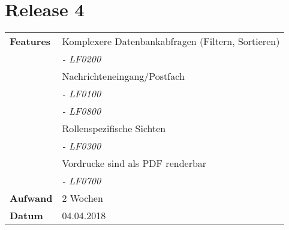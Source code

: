 \section*{Release 4}
\label{sec:release_4}

\begin{tabular}{p{5cm} p{9cm}}
    \textbf{Features} & Komplexere Datenbankabfragen (Filtern, Sortieren) \\
    & \hspace{8pt} \textit{\footnotesize - LF0200} \\
    & Nachrichteneingang/Postfach \\
    & \hspace{8pt} \textit{\footnotesize - LF0100} \\
    & \hspace{8pt} \textit{\footnotesize - LF0800} \\
	& Rollenspezifische Sichten \\
	& \hspace{8pt} \textit{\footnotesize - LF0300} \\
    & Vordrucke sind als PDF renderbar \\
    & \hspace{8pt} \textit{\footnotesize - LF0700} \\
    \hline
    \textbf{Aufwand} & 2 Wochen \\
    \hline
    \textbf{Datum} & 04.04.2018
\end{tabular}
